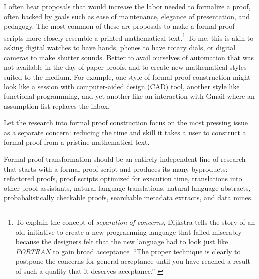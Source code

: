 \documentclass{llncs}
\begin{document}
I often hear proposals that would increase the labor needed to
formalize a proof, often backed by goals such as ease of maintenance,
elegance of presentation, and pedagogy.  The most common of these are
proposals to make a formal proof scripts more closely resemble a
printed mathematical text.\footnote{To explain the concept of {\it
    separation of concerns}, Dijkstra tells the story of an old
  initiative to create a new programming language that failed
  miserably because the designers felt that the new language had to
  look just like {\it FORTRAN} to gain broad acceptance. ``The proper
  technique is clearly to postpone the concerns for general acceptance
  until you have reached a result of such a quality that it deserves
  acceptance.'' \cite{XX Dijks, Scientific Thought }} To me, this is
akin to asking digital watches to have hands, phones to have rotary
dials, or digital cameras to make shutter sounds.  Better to avail
ourselves of automation that was not available in the day of paper
proofs, and to create new mathematical styles suited to the medium.
For example, one style of formal proof construction might look like a
session with computer-aided design (CAD) tool, another style like
functional programming, and yet another like an interaction with Gmail
where an assumption list replaces the inbox.


Let the research into formal proof construction focus on the most
pressing issue as a separate concern: reducing the time and skill it
takes a user to construct a formal proof from a pristine mathematical
text.

Formal proof transformation should be an entirely independent line of
research that starts with a formal proof script and produces its many
byproducts: refactored proofs, proof scripts optimized for execution
time, translations into other proof assistants, natural language 
translations, natural language abstracts, probabalistically checkable
proofs, searchable metadata extracts, and data mines.




\end{document}
